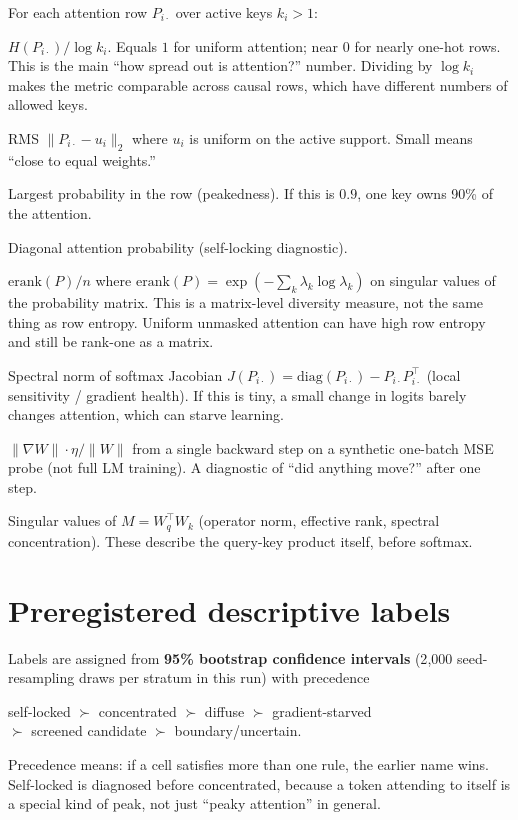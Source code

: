 \documentclass[11pt,a4paper]{report}
\newcommand{\Hnorm}{H_{\mathrm{norm}}}
\begin{document}
For each attention row $P_{i\cdot}$ over active keys $k_i>1$:
\begin{description}[style=nextline,leftmargin=2.4cm]
  \item[Normalized entropy $\Hnorm$]
    $H(P_{i\cdot})/\log k_i$. Equals $1$ for uniform attention; near $0$ for nearly one-hot rows. This is the main ``how spread out is attention?'' number. Dividing by $\log k_i$ makes the metric comparable across causal rows, which have different numbers of allowed keys.
  \item[Distance from uniform $d_{\mathrm{unif}}$]
    RMS $\|P_{i\cdot}-u_i\|_2$ where $u_i$ is uniform on the active support. Small means ``close to equal weights.''
  \item[Maximum mass $\max_j P_{ij}$]
    Largest probability in the row (peakedness). If this is $0.9$, one key owns 90\% of the attention.
  \item[Self-mass $P_{ii}$]
    Diagonal attention probability (self-locking diagnostic).
  \item[Attention effective rank]
    $\mathrm{erank}(P)/n$ where $\mathrm{erank}(P)=\exp(-\sum_k \lambda_k\log\lambda_k)$ on singular values of the probability matrix. This is a matrix-level diversity measure, not the same thing as row entropy. Uniform unmasked attention can have high row entropy and still be rank-one as a matrix.
  \item[Jacobian operator norm $\|J\|_2$]
    Spectral norm of softmax Jacobian $J(P_{i\cdot})=\mathrm{diag}(P_{i\cdot})-P_{i\cdot}P_{i\cdot}^\top$ (local sensitivity / gradient health). If this is tiny, a small change in logits barely changes attention, which can starve learning.
  \item[Update-to-weight ratio]
    $\|\nabla W\|\cdot\eta/\|W\|$ from a single backward step on a synthetic one-batch MSE probe (not full LM training). A diagnostic of ``did anything move?'' after one step.
  \item[Kernel metrics]
    Singular values of $M=W_q^\top W_k$ (operator norm, effective rank, spectral concentration). These describe the query-key product itself, before softmax.
\end{description}

\section{Preregistered descriptive labels}

Labels are assigned from \textbf{95\% bootstrap confidence intervals} (2{,}000 seed-resampling draws per stratum in this run) with precedence
\begin{center}
\small
self-locked $\succ$ concentrated $\succ$ diffuse $\succ$ gradient-starved\\
$\succ$ screened candidate $\succ$ boundary/uncertain.
\end{center}
Precedence means: if a cell satisfies more than one rule, the earlier name wins. Self-locked is diagnosed before concentrated, because a token attending to itself is a special kind of peak, not just ``peaky attention'' in general.
\end{document}
